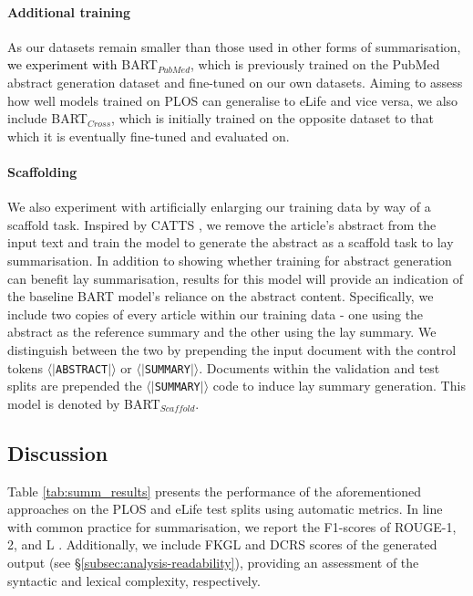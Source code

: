 \documentclass[11pt]{article}
\begin{document}
\paragraph{Additional training} 
As our datasets remain smaller than those used in other forms of summarisation, \textcolor{black}{we experiment with} \textsc{BART}$_{PubMed}$, which is previously trained on the PubMed abstract generation dataset \citep{Cohan2018-nq} and fine-tuned on our own datasets. Aiming to assess how well models trained on PLOS can generalise to eLife and vice versa, we also include \textsc{BART}$_{Cross}$, which is initially trained on the opposite dataset to that which it is eventually fine-tuned and evaluated on.

\paragraph{Scaffolding}
We also experiment with artificially enlarging our training data by way of a scaffold task. Inspired by CATTS \citep{Cachola2020-bx}, we remove the article's abstract from the input text and train the model to generate the abstract as a scaffold task to lay summarisation. In addition to showing whether training for abstract generation can benefit lay summarisation, results for this model will provide an indication of the baseline \textsc{BART} model's reliance on the abstract content.
Specifically, we include two copies of every article within our training data - one using the abstract as the reference summary and the other using the lay summary. We distinguish between the two by prepending the input document with the control tokens \texttt{$\langle|$ABSTRACT$|\rangle$} or \texttt{$\langle|$SUMMARY$|\rangle$}. Documents within the validation and test splits are prepended the \texttt{$\langle|$SUMMARY$|\rangle$} code to induce lay summary generation. This model is denoted by \textsc{BART}$_{Scaffold}$. 

\subsection{Discussion} \label{subsec:results-discussion}
Table \ref{tab:summ_results} presents the performance of the aforementioned approaches on the PLOS and eLife test splits using automatic metrics. In line with common practice for summarisation, we report the F1-scores of ROUGE-1, 2, and L \citep{lin-2004-rouge}. Additionally, we include FKGL and DCRS scores of the generated output (see \S\ref{subsec:analysis-readability}), providing an assessment of the syntactic and lexical complexity, respectively. 
\end{document}
